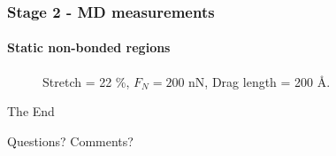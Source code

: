\documentclass[
	10pt, %
]{beamer}
\begin{document}
\begin{frame}
	\frametitle{Stage 2 - MD measurements}
	\framesubtitle{Static non-bonded regions}


	\begin{figure}
		\centering    
		\caption{Stretch = 22 \%, $F_N = 200$ nN, Drag length = 200 Å.}
   \end{figure} 

\end{frame}


\begin{frame}[plain] %
	\begin{center}
		{\Huge The End}
		
		\bigskip\bigskip %
		
		{\LARGE Questions? Comments?}
	\end{center}
\end{frame}

\end{document}
